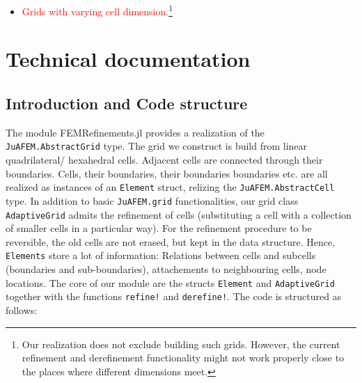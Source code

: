 \documentclass{article}
\begin{document}
\begin{itemize}
    \item \textcolor{red}{Grids with varying cell dimension.}\footnote{Our realization does not exclude building such grids. However, the current refinement and derefinement functionality might not work properly close to the places where different dimensions meet.} 
\end{itemize}

\newpage
\section{Technical documentation}




\subsection{Introduction and Code structure} 
The module FEMRefinements.jl provides a realization of the \texttt{JuAFEM.AbstractGrid} type. The grid we construct is build from linear quadrilateral/ hexahedral  cells. Adjacent cells are connected through their boundaries. Cells, their boundaries, their boundaries boundaries etc. are all realized as instances of an \texttt{Element} struct, relizing the \texttt{JuAFEM.AbstractCell} type. In addition to basic \texttt{JuAFEM.grid} functionalities, our grid class \texttt{AdaptiveGrid} admits the refinement of cells (substituting a cell with a collection of smaller cells in a particular way). For the refinement procedure to be reversible, the old cells are not erased, but kept in the data structure. Hence, \texttt{Elements} store a lot of information: Relations between cells and subcells (boundaries and sub-boundaries), attachements to neighbouring cells, node locations. The core of our module are the structs \texttt{Element} and \texttt{AdaptiveGrid} together with the functions \texttt{refine!} and \texttt{derefine!}. The code is structured as follows:
\end{document}
